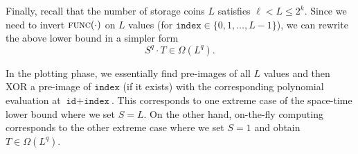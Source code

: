 \documentclass[conference]{IEEEtran}
\newcommand{\id}{\texttt{id}}
\newcommand{\seed}{\texttt{seed}}
\newcommand{\ind}{\texttt{index}}
\newcommand{\mask}{\textsc{mask}}
\newcommand{\func}{\textsc{func}}
\begin{document}

Finally, recall that the number of storage coins $L$ satisfies $\ell < L \le 2^k$. Since we need to invert $\func(\cdot)$ on $L$ values (for $\ind \in \{0, 1, \ldots, L - 1 \}$), we can rewrite the above lower bound in a simpler form 
\begin{equation}\label{eq:general_bound}
    S^q \cdot T \in \Omega\left(L^q \right).
\end{equation}

In the plotting phase, we essentially find pre-images of all $L$ values  and then XOR a pre-image of $\ind$ (if it exists) with the corresponding polynomial evaluation at $\id + \ind$. 
This corresponds to one extreme case of the space-time lower bound where we set $S = L$.
On the other hand, on-the-fly computing corresponds to the other extreme case where we set $S = 1$ and obtain $T \in \Omega\left(L^q \right)$.





\end{document}
